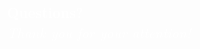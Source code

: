 \documentclass[aspectratio=169]{beamer}
\begin{document}
{
\begin{frame}
    \begin{center}
        \textcolor{white}{{\fontsize{22pt}{14pt}\selectfont \textbf{Questions?}}}\\
        \vspace{20pt}
        \textcolor{white}{{\fontsize{14pt}{10pt}\selectfont \textsl{Thank you for your attention!}}}
    \end{center}
\end{frame}
}
\end{document}
